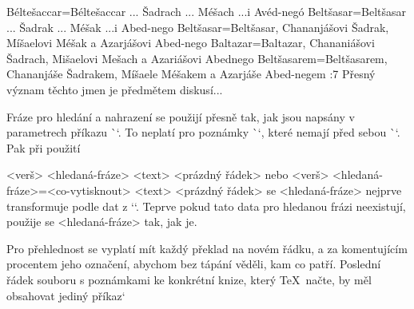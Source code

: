 \begtt
{}  %
    {Béltešaccar}={Béltešaccar ... Šadrach ... Méšach ...i Avéd-negó} %
    {Beltšasar}={Beltšasar ... Šadrak ... Méšak ...i Abed-nego}  %
    {Beltšasar}={Beltšasar, Chananjášovi Šadrak, Míšaelovi Méšak a Azarjášovi Abed-nego}
    {Baltazar}={Baltazar, Chananiášovi Šadrach, Mišaelovi Mešach a Azariášovi Abednego}
    {Beltšasarem}={Beltšasarem, Chananjáše Šadrakem, Míšaele Méšakem a Azarjáše Abed-negem}
:7  {} Přesný význam těchto jmen je předmětem diskusí...
\endtt

Fráze pro hledání a nahrazení se použijí přesně tak, jak jsou napsány v
parametrech příkazu \`\ww`. To neplatí pro poznámky \`\Note`, které nemají
před sebou \`\ww`. Pak při použití

\begtt
\Note <verš> {<hledaná-fráze>} <text> <prázdný řádek>
\endtt
nebo
\begtt
\Note <verš> {<hledaná-fráze>}={<co-vytisknout>} <text> <prázdný řádek>
\endtt
se <hledaná-fráze> nejprve transformuje podle dat z `\vdef`. Teprve pokud
tato data pro hledanou frázi neexistují, použije se <hledaná-fráze> tak,
jak je.

\doporucujeme Pro přehlednost se vyplatí mít každý překlad na novém řádku, a za komentujícím procentem jeho označení, abychom bez tápání věděli, kam co patří.
Poslední řádek souboru s poznámkami ke konkrétní knize, který \TeX\ načte, by měl obsahovat jediný příkaz`\endinput`.
Cokoliv bude následovat pod tímto pokynem na dalších řádcích, \TeX\ už neuvidí. (Ale nezaměňujte ho s `\end` nebo `\bye`, aby v tomto místě neskočil svůj běh, ale pokračoval čtením
dalších souborů.)

Pod příkazem `\endinput` tedy můžeme mít připraveno několik řádků např. v této podobě:

\begtt
\ww {}={} %
    {}={} %
    {}={} %
    {}={} %
    {}={} %
    {}={} %
\Note 1:1 {}
\endtt

a tyto řádky pak stačí zkopírovat na místo nové poznámky, upravit číslo kapitoly a verše za `\Note`, popřípadě umazat `={}`, kde nejsou zapotřebí. Neztratíme přehled,  kam
patří které fráze, ať už je vypisujeme ručně nebo kopírujeme z biblického programu či  on-line zdroje.




\secc[switch] Větvení zpracování textu podle variant překladu

Pomocí příkazu \`\switch` můžete větvit zpracování vstupního textu v
závislosti na nastavené hodnotě parametru \`\tmark`, tedy v závislosti na
aktuálně zpracovávané variantě jazyka. Příkaz má tuto syntaxi:
\begtt
\switch {<seznam variant>} {<co provést>}%
        {<seznam variant>} {<co provést>}%
        {<seznam variant>} {<co provést>}
\endtt
Dvojic `{<seznam variant>}{<co provést>}` může být uvedeno libovolně mnoho.
Za každou dvojicí `{<seznam variant>}{<co provést>}` (s výjimkou poslední
dvojice) musí bezprostředně a bez mezer následovat další taková dvojice,
proto je nutné při přechodu na
další řádek napsat za uzavírací závorku procento, které zakryje mezeru z
konce řádku. Mezery na začátku dalšího řádku nevadí.
Procento za dvojicí můžete číst jako \uv{pokračuje další dvojice}.

